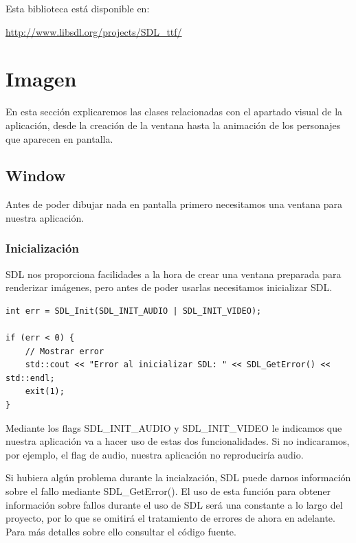 \documentclass[parskip=half*]{scrartcl}
\begin{document}
	Esta biblioteca est\'a disponible en: \\

	\centerline{\url{http://www.libsdl.org/projects/SDL_ttf/}}


\newpage
\section{Imagen}
En esta secci\'on explicaremos las clases relacionadas con el apartado visual de la aplicaci\'on, desde la creaci\'on de la ventana hasta la animaci\'on de los personajes que aparecen en pantalla.
	\subsection{Window}
	Antes de poder dibujar nada en pantalla primero necesitamos una ventana para nuestra aplicaci\'on.
		\subsubsection{Inicializaci\'on}
			SDL nos proporciona facilidades a la hora de crear una ventana preparada para renderizar im\'agenes, pero antes de poder usarlas necesitamos inicializar SDL.

			\begin{verbatim}
int err = SDL_Init(SDL_INIT_AUDIO | SDL_INIT_VIDEO);
    
if (err < 0) {
    // Mostrar error
    std::cout << "Error al inicializar SDL: " << SDL_GetError() << std::endl;
    exit(1);
}
			\end{verbatim}

			Mediante los flags SDL\_INIT\_AUDIO y SDL\_INIT\_VIDEO le indicamos que nuestra aplicaci\'on va a hacer uso de estas dos funcionalidades. Si no indicaramos, por ejemplo, el flag de audio, nuestra aplicaci\'on no reproducir\'ia audio.

			Si hubiera alg\'un problema durante la incialzaci\'on, SDL puede darnos informaci\'on sobre el fallo mediante SDL\_GetError(). El uso de esta funci\'on para obtener informaci\'on sobre fallos durante el uso de SDL ser\'a una constante a lo largo del proyecto, por lo que se omitir\'a el tratamiento de errores de ahora en adelante. Para m\'as detalles sobre ello consultar el c\'odigo fuente.
\end{document}
